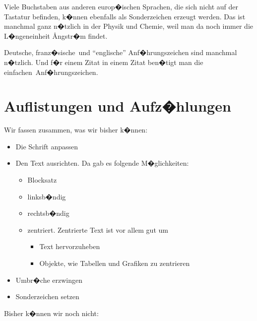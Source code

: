 \documentclass[11pt,a4paper]{article} %
\begin{document}
Viele Buchstaben aus anderen europ�ischen Sprachen, die sich nicht auf der Tastatur befinden, k�nnen ebenfalls als Sonderzeichen erzeugt werden. Das ist manchmal ganz n�tzlich in der Physik und Chemie, weil man da noch immer die L�ngeneinheit \AA ngstr�m findet. 

\glqq Deutsche\grqq, \flqq franz�sische\frqq\ und ``englische'' Anf�hrungszeichen sind manchmal n�tzlich. Und f�r einem Zitat in einem Zitat ben�tigt man die \glq einfachen\grq\ Anf�hrungszeichen. 


\section{Auflistungen und Aufz�hlungen}
\label{Listen}


Wir fassen zusammen, was wir bisher k�nnen:

\begin{itemize}
 \item Die Schrift anpassen
 \item Den Text ausrichten. Da gab es folgende M�glichkeiten:
    \begin{itemize}
        \item Blocksatz
        \item linksb�ndig
        \item rechtsb�ndig
        \item zentriert. Zentrierte Text ist vor allem gut um
            \begin{itemize}
                \item Text hervorzuheben
                \item Objekte, wie Tabellen und Grafiken zu zentrieren
            \end{itemize}
    \end{itemize}
 \item Umbr�che erzwingen
 \item Sonderzeichen setzen
\end{itemize}

Bisher k�nnen wir noch nicht:
\end{document}
